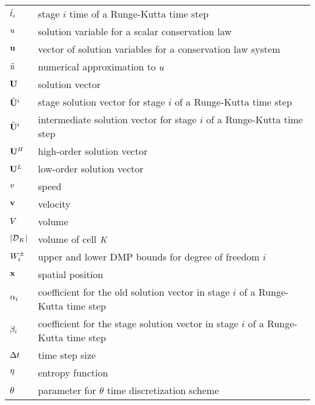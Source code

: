 \begin{center}
\begin{longtable}{l p{4.8in}}
$\hat{t}_i$   & stage $i$ time of a Runge-Kutta time step\\
$u$  & solution variable for a scalar conservation law\\
$\mathbf{u}$  & vector of solution variables for a conservation law
                     system\\
$\tilde{u}$ & numerical approximation to $u$\\
$\mathbf{U}$  & solution vector\\
$\hat{\mathbf{U}}^i$ & stage solution vector for stage $i$ of a Runge-Kutta time
                       step\\
$\tilde{\mathbf{U}}^i$ & intermediate solution vector for stage $i$ of a
                              Runge-Kutta time step\\
$\highordersolution$ & high-order solution vector\\
$\lowordersolution$ & low-order solution vector\\

$v$           & speed\\
$\mathbf{v}$        & velocity\\
$V$          & volume\\
$|\mathcal{D}_K|$      & volume of cell $K$\\
$W^\pm_i$      & upper and lower DMP bounds for degree of freedom $i$\\
$\mathbf{x}$               & spatial position\\
$\alpha_i$ & coefficient for the old solution vector in stage
                         $i$ of a Runge-Kutta time step\\
$\beta_i$ & coefficient for the stage solution vector in stage
                           $i$ of a Runge-Kutta time step\\
$\Delta t$    & time step size\\
$\eta$         & entropy function\\
$\theta$           & parameter for $\theta$ time discretization scheme\\


\end{longtable}
\end{center}
